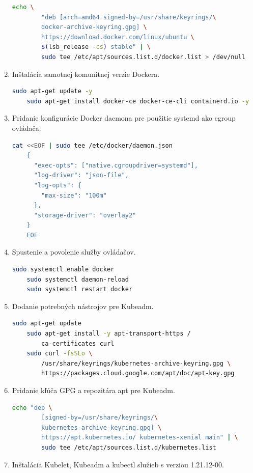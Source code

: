 \begin{enumerate}
{\begin{lstlisting}[language=Bash,basicstyle=\footnotesize]
    echo \
        "deb [arch=amd64 signed-by=/usr/share/keyrings/\
        docker-archive-keyring.gpg] \
        https://download.docker.com/linux/ubuntu \
        $(lsb_release -cs) stable" | \
        sudo tee /etc/apt/sources.list.d/docker.list > /dev/null
\end{lstlisting}}
\item{\noindent Inštalácia samotnej komunitnej verzie Dockera.
\begin{lstlisting}[language=Bash,basicstyle=\footnotesize]
    sudo apt-get update -y
    sudo apt-get install docker-ce docker-ce-cli containerd.io -y
\end{lstlisting}}
\item{\noindent Pridanie konfigurácie Docker daemona pre použitie systemd ako cgroup ovládača.
\begin{lstlisting}[language=Bash,basicstyle=\footnotesize]
    cat <<EOF | sudo tee /etc/docker/daemon.json
    {
      "exec-opts": ["native.cgroupdriver=systemd"],
      "log-driver": "json-file",
      "log-opts": {
        "max-size": "100m"
      },
      "storage-driver": "overlay2"
    }
    EOF
\end{lstlisting}}
\item{\noindent Spustenie a povolenie služby ovládačov.
\begin{lstlisting}[language=Bash,basicstyle=\footnotesize]
    sudo systemctl enable docker
    sudo systemctl daemon-reload
    sudo systemctl restart docker
\end{lstlisting}}
\item{\noindent Dodanie potrebných nástrojov pre Kubeadm.
\begin{lstlisting}[language=Bash,basicstyle=\footnotesize]
    sudo apt-get update
    sudo apt-get install -y apt-transport-https /
        ca-certificates curl
    sudo curl -fsSLo \
        /usr/share/keyrings/kubernetes-archive-keyring.gpg \
        https://packages.cloud.google.com/apt/doc/apt-key.gpg
\end{lstlisting}}
\item{\noindent Pridanie kľúča GPG a repozitára \acrshort{apt} pre Kubeadm.
\begin{lstlisting}[language=Bash,basicstyle=\footnotesize]
    echo "deb \
        [signed-by=/usr/share/keyrings/\
        kubernetes-archive-keyring.gpg] \
        https://apt.kubernetes.io/ kubernetes-xenial main" | \
        sudo tee /etc/apt/sources.list.d/kubernetes.list
\end{lstlisting}}
\item{\noindent Inštalácia Kubelet, Kubeadm a kubectl služieb s verziou 1.21.12-00.
}
\end{enumerate}
